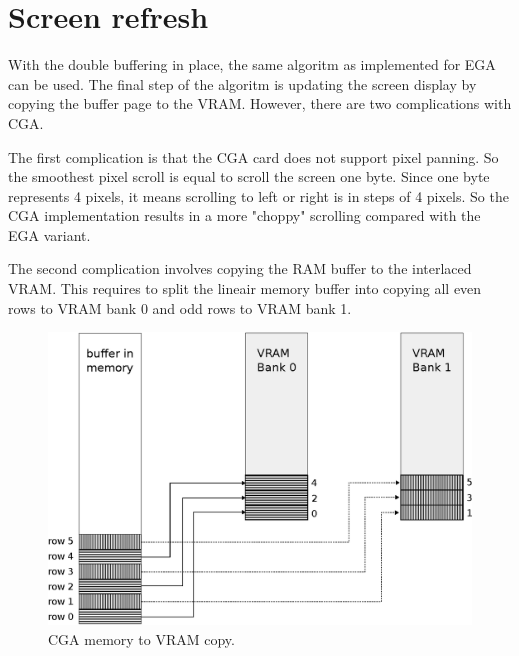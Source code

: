 \documentclass[book.tex]{subfiles}
\begin{document}
\section{Screen refresh}
With the double buffering in place, the same algoritm as implemented for EGA can be used. The final step of the algoritm is updating the screen display by copying the buffer page to the VRAM. However, there are two complications with CGA.\\

\par
The first complication is that the CGA card does not support pixel panning. So the smoothest pixel scroll is equal to scroll the screen one byte. Since one byte represents 4 pixels, it means scrolling to left or right is in steps of 4 pixels. So the CGA implementation results in a more "choppy" scrolling compared with the EGA variant.\\

\par
\begin{minipage}{\textwidth}
  
\end{minipage}
\label{state_type}
\par

The second complication involves copying the RAM buffer to the interlaced VRAM. This requires to split the lineair memory buffer into copying all even rows to VRAM bank 0 and odd rows to VRAM bank 1.\\

\begin{figure}[H]
\centering
\includegraphics[width=1.0\textwidth]{imgs/drawings/cga_VRAM_copy.eps}
\caption{CGA memory to VRAM copy.}
\label{fig:cga_interlaced}
\end{figure}
\end{document}
